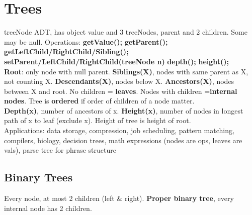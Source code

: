 \section{Trees}
treeNode ADT, has object value and 3 treeNodes, parent and 2 children. Some may be null. Operations: \textbf{getValue();} \textbf{getParent();} \textbf{getLeftChild/RightChild/Sibling();} \textbf{setParent/LeftChild/RightChild(treeNode n)} \textbf{depth();} \textbf{height();} \\\textbf{Root}: only node with null parent. \textbf{Siblings(X)}, nodes with same parent as X, not counting X. \textbf{Descendants(X)}, nodes below X. \textbf{Ancestors(X)}, nodes between X and root. No children = \textbf{leaves}. Nodes with children =\textbf{internal nodes}. Tree is \textbf{ordered} if order of children of a node matter.
\\\textbf{Depth(x)}, number of ancestors of x. \textbf{Height(x)}, number of nodes in longest path of x to leaf (exclude x). Height of tree is height of root.
\\Applications: data storage, compression, job scheduling, pattern matching, compilers, biology, decision trees, math expressions (nodes are ops, leaves are vals), parse tree for phrase structure
\subsection{Binary Trees}
Every node, at most 2 children (left \& right). \textbf{Proper binary tree}, every internal node has 2 children.

